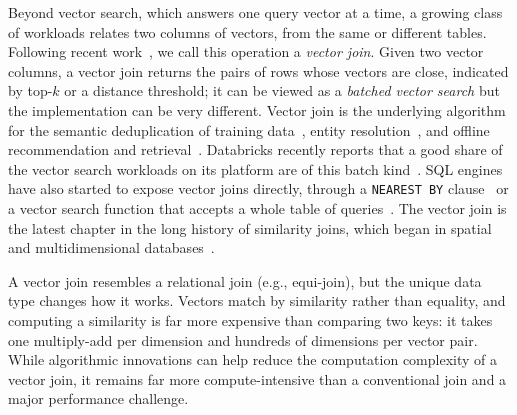 Beyond vector search, which answers one query vector at a time, a growing class of workloads relates two columns of vectors, from the same or different tables.
Following recent work~\cite{KimVectorJoin26}, we call this operation a \textit{vector join}.
Given two vector columns, a vector join returns the pairs of rows whose vectors are close, indicated by top-$k$ or a distance threshold;
it can be viewed as a \textit{batched vector search} but the implementation can be very different.
Vector join is the underlying algorithm for the semantic deduplication of training data~\cite{AbbasSemDeDup23, HuSieveIVF26, NeMoCurator}, entity resolution~\cite{SantanaEMJoin25, SantanaRibeiro23}, and offline recommendation and retrieval~\cite{HuangFBRetrieval20, XiongANCE21}. Databricks recently reports that a good share of the vector search workloads on its platform are of this batch kind~\cite{DatabricksNearestByJoinBlog26}.
SQL engines have also started to expose vector joins directly, through a \texttt{NEAREST BY} clause~\cite{SparkNearestByJoin26, DatabricksNearestByJoinBlog26} or a vector search function that accepts a whole table of queries~\cite{BigQueryVectorSearchFn}.
The vector join is the latest chapter in the long history of similarity joins, which began in spatial and multidimensional databases~\cite{BrinkhoffSpatialJoin93, ShimSimJoin97, BohmKrebsKNNJoin04}.

A vector join resembles a relational join (e.g., equi-join), but the unique data type changes how it works.
Vectors match by similarity rather than equality, and computing a similarity is far more expensive than comparing two keys: it takes one multiply-add per dimension and hundreds of dimensions per vector pair.
While algorithmic innovations can help reduce the computation complexity of a vector join, it remains far more compute-intensive than a conventional join and a major performance challenge.

